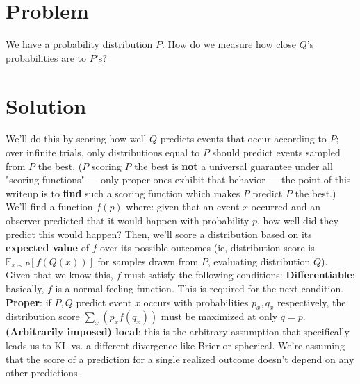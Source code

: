 \documentclass[12pt]{article}
\begin{document}
\pagebreak
\begin{outline}

\section{Problem}

We have a probability distribution $P$. How do we measure how close $Q$'s probabilities are to $P$'s?

\section{Solution}

We'll do this by scoring how well $Q$ predicts events that occur according to $P$; over infinite trials, only distributions equal to $P$ should predict events sampled from $P$ the best. ($P$ scoring $P$ the best is \textbf{not} a universal guarantee under all "scoring functions" --- only proper ones exhibit that behavior --- the point of this writeup is to \textbf{find} such a scoring function which makes $P$ predict $P$ the best.) \\

We'll find a function $f(p)$ where: given that an event $x$ occurred and an observer predicted that it would happen with probability $p$, how well did they predict this would happen? Then, we'll score a distribution based on its \textbf{expected value} of $f$ over its possible outcomes (ie, distribution score is $\mathbb E_{x \sim P} [f(Q(x))]$ for samples drawn from $P$, evaluating distribution $Q$).\\

Given that we know this, $f$ must satisfy the following conditions:
\1 \textbf{Differentiable}: basically, $f$ is a normal-feeling function. This is required for the next condition.
\1 \textbf{Proper}: if $P,Q$ predict event $x$ occurs with probabilities $p_x,q_x$ respectively, the distribution score $\displaystyle \sum_x (p_x f(q_x))$ must be maximized at only $q=p$.
\1 \textbf{(Arbitrarily imposed) local}: this is the arbitrary assumption that specifically leads us to KL vs. a different divergence like Brier or spherical. We're assuming that the score of a prediction for a single realized outcome doesn't depend on any other predictions.
\\\0


\end{outline}
\end{document}
